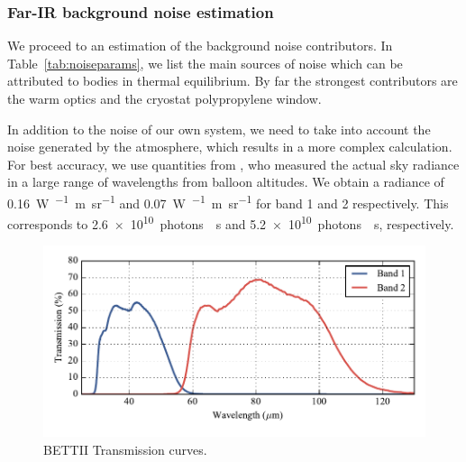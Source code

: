 \subsubsection{Far-IR background noise estimation}

We proceed to an estimation of the background noise contributors. In Table~\ref{tab:noiseparams}, we list the main sources of noise which can be attributed to bodies in thermal equilibrium. By far the strongest contributors are the warm optics and the cryostat polypropylene window.

In addition to the noise of our own system, we need to take into account the noise generated by the atmosphere, which results in a more complex calculation. For best accuracy, we use quantities from \cite{Harries:1980cva}, who measured the actual sky radiance in a large range of wavelengths from balloon altitudes. We obtain a radiance of \SI{0.16}{\watt\per{}\meter\per\steradian} and \SI{0.07}{\watt\per{}\meter\per\steradian} for band 1 and 2 respectively. This corresponds to \num{2.6e10}~photons~\si{\per\second} and \num{5.2e10}~photons~\si{\per\second}, respectively. 


\begin{figure}[!ht]
	\centering
	\includegraphics[width=\textwidth]{Figures/BETTII_transmission.pdf}
	\caption[BETTII Transmission curves]{BETTII Transmission curves.}
	\label{fig:aperturesynthesis}
    \end{figure}


